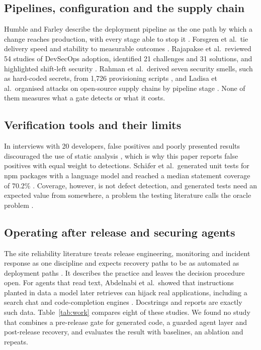 \documentclass[12pt,onecolumn,draftclsnofoot]{IEEEtran}
\begin{document}
\subsection{Pipelines, configuration and the supply chain}
Humble and Farley describe the deployment pipeline as the one path by which a change reaches production, with every stage able to stop it \cite{humble2010}. Forsgren et al.\ tie delivery speed and stability to measurable outcomes \cite{forsgren2018}. Rajapakse et al.\ reviewed 54 studies of DevSecOps adoption, identified 21 challenges and 31 solutions, and highlighted shift-left security \cite{rajapakse2022}. Rahman et al.\ derived seven security smells, such as hard-coded secrets, from 1,726 provisioning scripts \cite{rahman2019sins}, and Ladisa et al.\ organised attacks on open-source supply chains by pipeline stage \cite{ladisa2023}. None of them measures what a gate detects or what it costs.

\subsection{Verification tools and their limits}
In interviews with 20 developers, false positives and poorly presented results discouraged the use of static analysis \cite{johnson2013}, which is why this paper reports false positives with equal weight to detections. Sch{\"a}fer et al.\ generated unit tests for npm packages with a language model and reached a median statement coverage of 70.2\% \cite{schafer2024}. Coverage, however, is not defect detection, and generated tests need an expected value from somewhere, a problem the testing literature calls the oracle problem \cite{barr2015}.

\subsection{Operating after release and securing agents}
The site reliability literature treats release engineering, monitoring and incident response as one discipline and expects recovery paths to be as automated as deployment paths \cite{beyer2016}. It describes the practice and leaves the decision procedure open. For agents that read text, Abdelnabi et al.\ showed that instructions planted in data a model later retrieves can hijack real applications, including a search chat and code-completion engines \cite{abdelnabi2023}. Docstrings and reports are exactly such data. Table~\ref{tab:work} compares eight of these studies. We found no study that combines a pre-release gate for generated code, a guarded agent layer and post-release recovery, and evaluates the result with baselines, an ablation and repeats.
\end{document}

